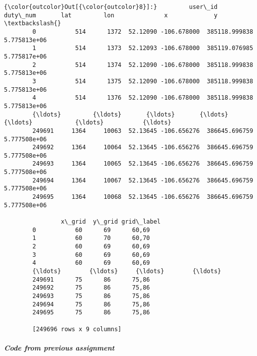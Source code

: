 \documentclass[11pt]{article}
\begin{document}
\begin{Verbatim}[commandchars=\\\{\}]
{\color{outcolor}Out[{\color{outcolor}8}]:}         user\_id  duty\_num       lat         lon              x             y  \textbackslash{}
        0           514      1372  52.12090 -106.678000  385118.999838  5.775813e+06   
        1           514      1373  52.12093 -106.678000  385119.076985  5.775817e+06   
        2           514      1374  52.12090 -106.678000  385118.999838  5.775813e+06   
        3           514      1375  52.12090 -106.678000  385118.999838  5.775813e+06   
        4           514      1376  52.12090 -106.678000  385118.999838  5.775813e+06   
        {\ldots}         {\ldots}       {\ldots}       {\ldots}         {\ldots}            {\ldots}           {\ldots}   
        249691     1364     10063  52.13645 -106.656276  386645.696759  5.777508e+06   
        249692     1364     10064  52.13645 -106.656276  386645.696759  5.777508e+06   
        249693     1364     10065  52.13645 -106.656276  386645.696759  5.777508e+06   
        249694     1364     10067  52.13645 -106.656276  386645.696759  5.777508e+06   
        249695     1364     10068  52.13645 -106.656276  386645.696759  5.777508e+06   
        
                x\_grid  y\_grid grid\_label  
        0           60      69      60,69  
        1           60      70      60,70  
        2           60      69      60,69  
        3           60      69      60,69  
        4           60      69      60,69  
        {\ldots}        {\ldots}     {\ldots}        {\ldots}  
        249691      75      86      75,86  
        249692      75      86      75,86  
        249693      75      86      75,86  
        249694      75      86      75,86  
        249695      75      86      75,86  
        
        [249696 rows x 9 columns]
\end{Verbatim}
            
    \hypertarget{code-from-previous-assignment}{%
\paragraph{\texorpdfstring{\emph{Code from previous
assignment}}{Code from previous assignment}}\label{code-from-previous-assignment}}
\end{document}
